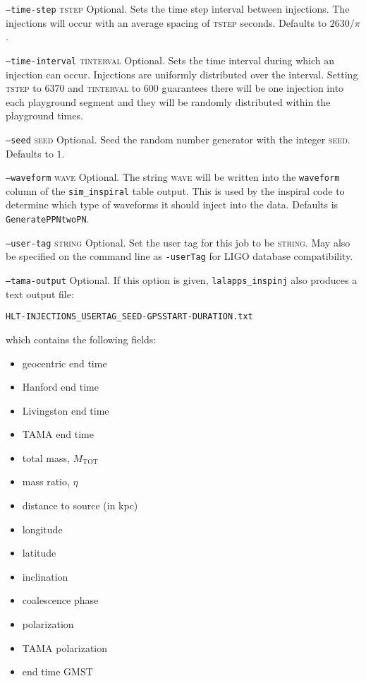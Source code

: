 \begin{entry}
\begin{entry}
\item[\texttt{--time-step} \textsc{tstep}]
Optional. Sets the time step interval between injections. The injections will
occur with an average spacing of \textsc{tstep} seconds. Defaults to 
$2630/\pi$.

\item[\texttt{--time-interval} \textsc{tinterval}]
Optional. Sets the time interval during which an injection can occur. 
Injections are uniformly distributed over the interval.  Setting \textsc{tstep}
to $6370$ and \textsc{tinterval} to 600 guarantees there will be one injection
into each playground segment and they will be randomly distributed within the
playground times.

\item[\texttt{--seed} \textsc{seed}]
Optional. Seed the random number generator with the integer \textsc{seed}.
Defaults to $1$.

\item[\texttt{--waveform} \textsc{wave}]
Optional. The string \textsc{wave} will be written into the \texttt{waveform}
column of the \texttt{sim\_inspiral} table output. This is used by the
inspiral code to determine which type of waveforms it should inject into the
data. Defaults is \texttt{GeneratePPNtwoPN}.

\item[\texttt{--user-tag} \textsc{string}] Optional. Set the user tag for this
job to be \textsc{string}. May also be specified on the command line as 
\texttt{-userTag} for LIGO database compatibility.

\item[\texttt{--tama-output}]
Optional.  If this option is given, \verb+lalapps_inspinj+ also produces a 
text output file:
\begin{center}
\begin{verbatim}
HLT-INJECTIONS_USERTAG_SEED-GPSSTART-DURATION.txt
\end{verbatim}
\end{center}
which contains the following fields:

\begin{itemize}
\item geocentric end time
\item Hanford end time
\item Livingston end time
\item TAMA end time
\item total mass, $M_{\mathrm{TOT}}$
\item mass ratio, $\eta$
\item distance to source (in kpc)
\item longitude
\item latitude
\item inclination
\item coalescence phase
\item polarization
\item TAMA polarization
\item end time GMST
\end{itemize}


\end{entry}
\end{entry}
